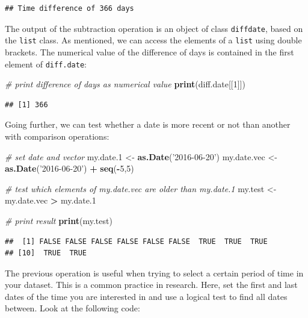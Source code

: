 \documentclass[11pt,]{book}
\newenvironment{Shaded}{\begin{snugshade}}{\end{snugshade}}
\newcommand{\KeywordTok}[1]{\textcolor[rgb]{0.27,0.27,0.27}{\textbf{#1}}}
\newcommand{\DecValTok}[1]{\textcolor[rgb]{0.06,0.06,0.06}{#1}}
\newcommand{\StringTok}[1]{\textcolor[rgb]{0.5,0.5,0.5}{#1}}
\newcommand{\CommentTok}[1]{\textcolor[rgb]{0.56,0.35,0.01}{\textit{#1}}}
\newcommand{\OperatorTok}[1]{\textcolor[rgb]{0.81,0.36,0.00}{\textbf{#1}}}
\newcommand{\NormalTok}[1]{#1}
\begin{document}
\begin{verbatim}
## Time difference of 366 days
\end{verbatim}

The output of the subtraction operation is an object of class
\texttt{diffdate}, based on the \texttt{list} class. As mentioned, we
can access the elements of a \texttt{list} using double brackets. The
numerical value of the difference of days is contained in the first
element of \texttt{diff.date}: 

\begin{Shaded}
\begin{Highlighting}[]
\CommentTok{# print difference of days as numerical value}
\KeywordTok{print}\NormalTok{(diff.date[[}\DecValTok{1}\NormalTok{]])}
\end{Highlighting}
\end{Shaded}

\begin{verbatim}
## [1] 366
\end{verbatim}

Going further, we can test whether a date is more recent or not than
another with comparison operations: 

\begin{Shaded}
\begin{Highlighting}[]
\CommentTok{# set date and vector}
\NormalTok{my.date.}\DecValTok{1}\NormalTok{ <-}\StringTok{ }\KeywordTok{as.Date}\NormalTok{(}\StringTok{'2016-06-20'}\NormalTok{)}
\NormalTok{my.date.vec <-}\StringTok{ }\KeywordTok{as.Date}\NormalTok{(}\StringTok{'2016-06-20'}\NormalTok{) }\OperatorTok{+}\StringTok{ }\KeywordTok{seq}\NormalTok{(}\OperatorTok{-}\DecValTok{5}\NormalTok{,}\DecValTok{5}\NormalTok{)}

\CommentTok{# test which elements of my.date.vec are older than my.date.1}
\NormalTok{my.test <-}\StringTok{ }\NormalTok{my.date.vec }\OperatorTok{>}\StringTok{ }\NormalTok{my.date.}\DecValTok{1}

\CommentTok{# print result}
\KeywordTok{print}\NormalTok{(my.test)}
\end{Highlighting}
\end{Shaded}

\begin{verbatim}
##  [1] FALSE FALSE FALSE FALSE FALSE FALSE  TRUE  TRUE  TRUE
## [10]  TRUE  TRUE
\end{verbatim}

The previous operation is useful when trying to select a certain period
of time in your dataset. This is a common practice in research. Here,
set the first and last dates of the time you are interested in and use a
logical test to find all dates between. Look at the following code:
\end{document}
